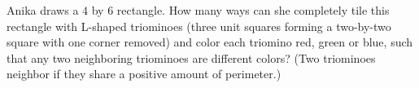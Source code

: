 Anika draws a $4$ by $6$ rectangle. How many ways can she completely tile this rectangle with L-shaped triominoes (three unit squares forming a two-by-two square with one corner removed) and color each triomino red, green or blue, such that any two neighboring triominoes are different colors? (Two triominoes neighbor if they share a positive amount of perimeter.)

